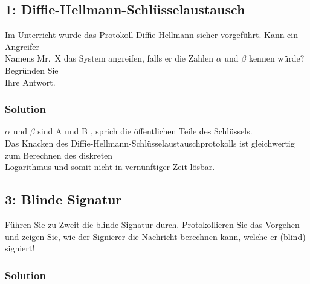 \documentclass[11pt]{article}
\begin{document}
    \hypertarget{diffie-hellmann-schluxfcsselaustausch}{%
\subsection{1:
Diffie-Hellmann-Schlüsselaustausch}\label{diffie-hellmann-schluxfcsselaustausch}}

Im Unterricht wurde das Protokoll Diffie-Hellmann sicher vorgeführt.
Kann ein Angreifer\\
Namens Mr.~X das System angreifen, falls er die Zahlen \(\alpha\) und
\(\beta\) kennen würde? Begründen Sie\\
Ihre Antwort.

\hypertarget{solution}{%
\subsubsection{Solution}\label{solution}}

\(\alpha\) und \(\beta\) sind A und B , sprich die öffentlichen Teile
des Schlüssels.\\
Das Knacken des Diffie-Hellmann-Schlüsselaustauschprotokolls ist
gleichwertig zum Berechnen des diskreten\\
Logarithmus und somit nicht in vernünftiger Zeit lösbar.

\newpage

    \hypertarget{blinde-signatur}{%
\subsection{3: Blinde Signatur}\label{blinde-signatur}}

Führen Sie zu Zweit die blinde Signatur durch. Protokollieren Sie das
Vorgehen und zeigen Sie, wie der Signierer die Nachricht berechnen kann,
welche er (blind) signiert!

\hypertarget{solution}{%
\subsubsection{Solution}\label{solution}}
\end{document}
